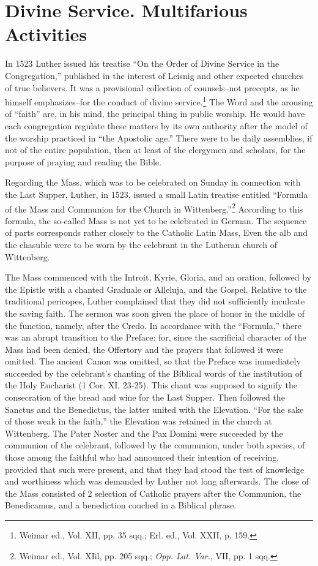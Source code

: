 \section{Divine Service. Multifarious Activities}

In 1523 Luther issued his treatise “On the Order of Divine Service
in the Congregation,” published in the interest of Leisnig and other
expected churches of true believers. It was a provisional collection
of counsels--not precepts, as he himself emphasizes--for the conduct of
divine service.\footnote{Weimar ed., Vol. XII, pp. 35 sqq.; Erl. ed., Vol. XXII, p. 159.}
The Word and the arousing of “faith” are,
in his mind, the principal thing in public worship. He would have
each congregation regulate these matters by its own authority after
the model of the worship practiced in “the Apostolic age.” There
were to be daily assemblies, if not of the entire population, then at
least of the clergymen and scholars, for the purpose of praying and
reading the Bible.

Regarding the Mass, which was to be celebrated on Sunday in
connection with the Last Supper, Luther, in 1523, issued a small
Latin treatise entitled “Formula of the Mass and Communion for
the Church in Wittenberg.”\footnote{Weimar ed., Vol. XIil, pp. 205 sqq.; \textit{Opp. Lat. Var.}, VII, pp. 1 sqq.}
According to this formula, the so-called
Mass is not yet to be celebrated in German. The sequence
of parts corresponds rather closely to the Catholic Latin Mass, Even
the alb and the chasuble were to be worn by the celebrant in the
Lutheran church of Wittenberg.

The Mass commenced with the Introit, Kyrie, Gloria, and an oration,
followed by the Epistle with a chanted Graduale or Alleluja, and the Gospel.
Relative to the traditional pericopes, Luther complained that they did not
sufficiently inculcate the saving faith. The sermon was soon given the place
of honor in the middle of the function, namely, after the Credo. In accordance
with the “Formula,” there was an abrupt transition to the Preface: for,
since the sacrificial character of the Mass had been denied, the Offertory and
the prayers that followed it were omitted. The ancient Canon was omitted,
so that the Preface was immediately succeeded by the celebrant’s chanting
of the Biblical words of the institution of the Holy Eucharist (1 Cor. XI,
23-25). This chant was supposed to signify the consecration of the bread
and wine for the Last Supper. Then followed the Sanctus and the Benedictus,
the latter united with the Elevation. “For the sake of those weak in the
faith,” the Elevation was retained in the church at Wittenberg. The Pater
Noster and the Pax Domini were succeeded by the communion of the celebrant,
followed by the communion, under both species, of those among the
faithful who had announced their intention of receiving, provided that such
were present, and that they had stood the test of knowledge and worthiness
which was demanded by Luther not long afterwards. The close of the Mass
consisted of 2 selection of Catholic prayers after the Communion, the
Benedicamus, and a benediction couched in a Biblical phrase.

